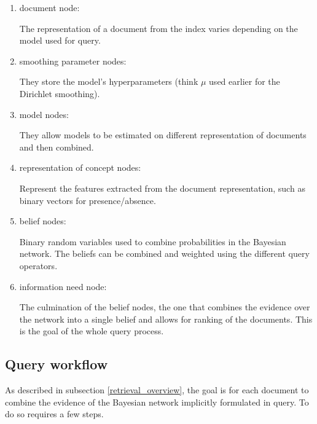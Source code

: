 \documentclass{article} %
\begin{document}
\begin{enumerate}
	\item document node: 
	
The representation of a document from the index varies depending on the model used for query.

	\item smoothing parameter nodes: 
	
They store the model's hyperparameters (think $\mu$ used earlier for the Dirichlet smoothing).

	\item model nodes: 

They allow models to be estimated on different representation of documents and then combined.

	\item representation of concept nodes: 
	
Represent the features extracted from the document representation, such as binary vectors for presence/absence. 

	\item belief nodes: 
	
Binary random variables used to combine probabilities in the Bayesian network. The beliefs can be combined and weighted using the different query operators.

	\item information need node: 
	
The culmination of the belief nodes, the one that combines the evidence over the network into a single belief and allows for ranking of the documents. This is the goal of the whole query process.
	
\end{enumerate}


\subsection{Query workflow}

As described in subsection \ref{retrieval_overview}, the goal is for each document to combine the evidence of the Bayesian network implicitly formulated in query. To do so requires a few steps.
\end{document}
